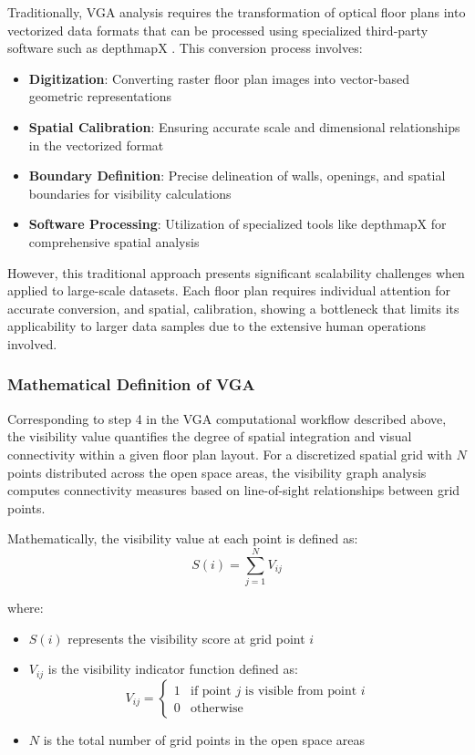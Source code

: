 Traditionally, VGA analysis requires the transformation of optical floor plans into vectorized data formats
 that can be processed using specialized third-party software such as depthmapX \cite{turner2001depthmap}. This conversion process involves:

\begin{itemize}
    \item \textbf{Digitization}: Converting raster floor plan images into vector-based geometric representations
    \item \textbf{Spatial Calibration}: Ensuring accurate scale and dimensional relationships in the vectorized format
    \item \textbf{Boundary Definition}: Precise delineation of walls, openings, and spatial boundaries for visibility calculations
    \item \textbf{Software Processing}: Utilization of specialized tools like depthmapX for comprehensive spatial analysis
\end{itemize}
However, this traditional approach presents significant scalability challenges when applied to large-scale datasets. 
Each floor plan requires individual attention for accurate conversion,
and spatial, calibration, showing a bottleneck that limits its applicability to larger data samples due to the extensive human operations involved.


\subsubsection{Mathematical Definition of VGA}

Corresponding to step 4 in the VGA computational workflow described above, 
the visibility value quantifies the degree of spatial integration and visual 
connectivity within a given floor plan layout. For a discretized spatial grid 
with $N$ points distributed across the open space areas, the visibility graph analysis computes connectivity measures based 
on line-of-sight relationships between grid points.

Mathematically, the visibility value at each point is defined as:
\begin{equation}
\label{eq:vga_definition}
S(i) = \sum_{j=1}^{N} V_{ij}
\end{equation}

where:
\begin{itemize}
    \item $S(i)$ represents the visibility score at grid point $i$
    \item $V_{ij}$ is the visibility indicator function defined as:
    \begin{equation}
    V_{ij} = \begin{cases}
    1 & \text{if point } j \text{ is visible from point } i \\
    0 & \text{otherwise}
    \end{cases}
    \end{equation}
    \item $N$ is the total number of grid points in the open space areas
\end{itemize}

